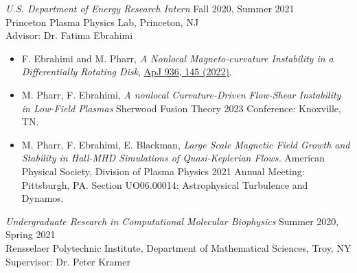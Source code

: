 \documentclass[margin]{rpires}
\begin{document}
\begin{resume}
    \vspace{0.5cm}
    \textit{U.S. Department of Energy Research Intern} \hfill Fall 2020, Summer 2021 \\
    Princeton Plasma Physics Lab, 
    Princeton, NJ\\ 
    Advisor: Dr. Fatima Ebrahimi
    \begin{itemize}  \itemsep -2pt %
    \item {F. Ebrahimi and M. Pharr, \textit{A Nonlocal Magneto-curvature Instability in a Differentially Rotating Disk}, \href{https://dx.doi.org/10.3847/1538-4357/ac892d}{ApJ 936, 145 (2022)}.}
    \vspace{0.5cm}
    \item M. Pharr, F. Ebrahimi, \textit{A nonlocal Curvature-Driven Flow-Shear Instability in Low-Field Plasmas} Sherwood Fusion Theory 2023 Conference: Knoxville, TN.
    \item M. Pharr, F. Ebrahimi, E. Blackman, \textit{Large Scale Magnetic Field Growth and Stability in Hall-MHD Simulations of Quasi-Keplerian Flows.} American Physical Society, Division of Plasma Physics 2021 Annual Meeting: Pittsburgh, PA. Section UO06.00014: Astrophysical Turbulence and Dynamos.
    \end{itemize}

    \vspace{0.5cm}
    \textit{Undergraduate Research in Computational Molecular Biophysics} \hfill Summer 2020, Spring 2021 \\
    Rensselaer Polytechnic Institute, 
    Department of Mathematical Sciences, Troy, NY\\
    Supervisor: Dr. Peter Kramer




\end{resume}
\end{document}
